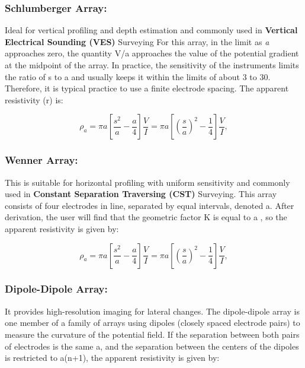 \documentclass[12pt,a4paper]{report}
\begin{document}
\subsubsection{Schlumberger Array:} 
Ideal for vertical profiling and depth estimation and commonly used in \textbf{Vertical Electrical Sounding (VES)} Surveying For this array, in the limit as \textit{a} approaches zero, the quantity V/a approaches the value of the potential gradient at the midpoint of the array.  In practice, the sensitivity of the instruments limits the ratio of s to a and usually keeps it within the limits of about 3 to 30.  Therefore, it is typical practice to use a finite electrode spacing. The apparent resistivity (r) is:

\begin{equation}
    \rho_a = \pi a \left[ \frac{s^2}{a} - \frac{a}{4} \right] \frac{V}{I} = \pi a \left[ \left( \frac{s}{a} \right)^2 - \frac{1}{4} \right] \frac{V}{I},
\end{equation}

\subsubsection{Wenner Array:}
This is suitable for horizontal profiling with uniform sensitivity and commonly used in \textbf{Constant Separation Traversing (CST)} Surveying. This array consists of four electrodes in line, separated by equal intervals, denoted a. After derivation, the user will find that the geometric factor K is equal to a , so the apparent resistivity is given by:

\begin{equation}
    \rho_a = \pi a \left[ \frac{s^2}{a} - \frac{a}{4} \right] \frac{V}{I} = \pi a \left[ \left( \frac{s}{a} \right)^2 - \frac{1}{4} \right] \frac{V}{I},
\end{equation}

\subsubsection{Dipole-Dipole Array:}
It provides high-resolution imaging for lateral changes. The dipole-dipole array is one member of a family of arrays using dipoles (closely spaced electrode pairs) to measure the curvature of the potential field.  If the separation between both pairs of electrodes is the same a, and the separation between the centers of the dipoles is restricted to a(n+1), the apparent resistivity is given by:
\end{document}
